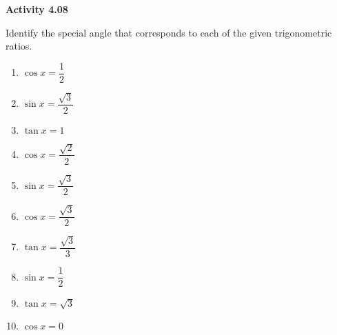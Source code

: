 \vspace{0.3ex}
\noindent\textbf{Activity 4.08}

\vspace{0.2ex}

Identify the special angle that corresponds to each of the given trigonometric ratios.
\begin{multicols}{2}
\begin{enumerate}
    \item \( \cos x = \dfrac{1}{2} \)
    \item \( \sin x = \dfrac{\sqrt{3}}{2} \)
    \item \( \tan x = 1 \)
    \item \( \cos x = \dfrac{\sqrt{2}}{2} \)
    \item \( \sin x = \dfrac{\sqrt{3}}{2} \)
    \item \( \cos x = \dfrac{\sqrt{3}}{2} \)
    \item \( \tan x = \dfrac{\sqrt{3}}{3} \)
    \item \( \sin x = \dfrac{1}{2} \)
    \item \( \tan x = \sqrt{3} \)
    \item \( \cos x = 0 \)
\end{enumerate}
\end{multicols}
